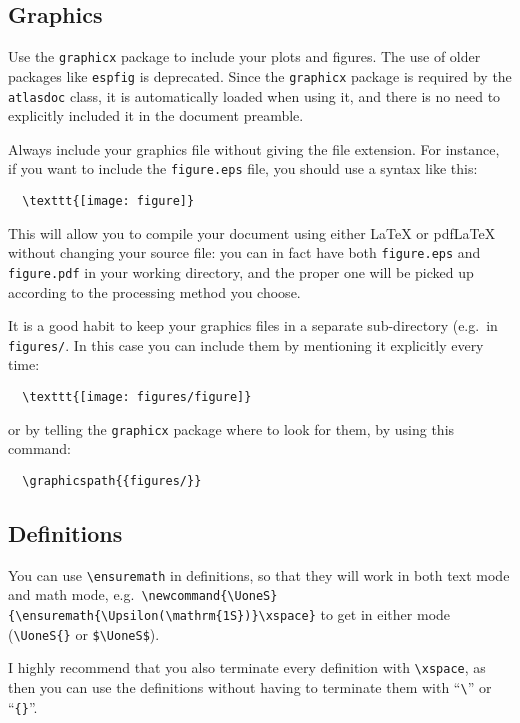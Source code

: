 \documentclass[koma,UKenglish]{style/atlasdoc}
\newcommand{\File}[1]{\texttt{#1}\xspace}
\newcommand{\Macro}[1]{\texttt{\textbackslash #1}\xspace}
\newcommand{\Package}[1]{\texttt{#1}\xspace}
\begin{document}
\subsection{Graphics}

Use the \Package{graphicx} package to include your plots and figures. 
The use of older packages like \Package{espfig} is deprecated.
Since the \Package{graphicx} package is required by the \texttt{atlasdoc}
class, it is automatically loaded when using it, and there is no need
to explicitly included it in the document preamble.

Always include your graphics file without giving the file extension.
For instance, if you want to include the \File{figure.eps}
file, you should use a syntax like this:
\begin{verbatim}
  \texttt{[image: figure]}
\end{verbatim}
This will allow you to compile your document using either \LaTeX{} or
pdf\LaTeX{} without changing your source file: you can in fact have
both \File{figure.eps} and \File{figure.pdf} in your working directory,
and the proper one will be picked up according to the processing method
you choose.

It is a good habit to keep your graphics files in a separate
sub-directory (e.g.\ in \File{figures/}. 
In this case you can include them by mentioning it explicitly every time:
\begin{verbatim}
  \texttt{[image: figures/figure]}
\end{verbatim}
or by telling the \texttt{graphicx} package where to look
for them, by using this command:
\begin{verbatim}
  \graphicspath{{figures/}}
\end{verbatim}


\subsection{Definitions}

You can use \verb|\ensuremath| in definitions, so that they will work
in both text mode and math mode, e.g.\
\verb|\newcommand{\UoneS}{\ensuremath{\Upsilon(\mathrm{1S})}\xspace}| to get
\UoneS{} in either mode (\verb|\UoneS{}| or \verb|$\UoneS$|).

I highly recommend that you also terminate every definition with \Macro{xspace},
as then you can use the definitions without having to terminate them with
``\verb|\|'' or ``\verb|{}|''.
\end{document}
